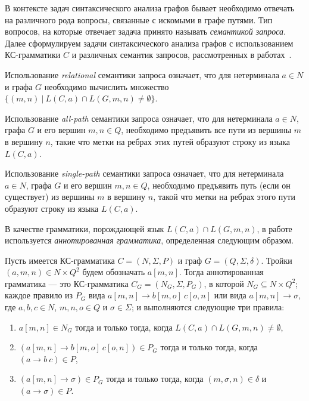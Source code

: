 В контексте задач синтаксического анализа графов бывает необходимо отвечать на различного рода вопросы, связанные с искомыми в графе путями. Тип вопросов, на которые отвечает задача принято называть \textit{семантикой запроса}. Далее сформулируем задачи синтаксического анализа графов с использованием КС-грамматики $C$ и различных семантик запросов, рассмотренных в работах~\cite{azimov-spbu-hellings1, azimov-spbu-hellings2}.

Использование \textit{relational} семантики запроса означает, что для нетерминала $a \in N$ и графа $G$ необходимо вычислить множество $\{(m, n)~|~L(C,a) \cap L(G,m,n) \neq \emptyset \}$.

Использование \textit{all-path} семантики запроса означает, что для нетерминала $a \in N$, графа $G$ и его вершин $m,n \in Q$, необходимо предъявить все пути из вершины $m$ в вершину $n$, такие что метки на ребрах этих путей образуют строку из языка $L(C,a)$.

Использование \textit{single-path} семантики запроса означает, что для нетерминала $a \in N$, графа $G$ и его вершин $m,n \in Q$, необходимо предъявить путь (если он существует) из вершины $m$ в вершину $n$, такой что метки на ребрах этого пути образуют строку из языка $L(C,a)$.

В качестве грамматики, порождающей язык $L(C,a) \cap L(G,m,n)$, в работе~\cite{azimov-spbu-hellings2} используется \textit{аннотированная грамматика}, определенная следующим образом.

\begin{mydef}
Пусть имеется КС-грамматика $C = (N,\Sigma,P)$ и граф $G = (Q,\Sigma,\delta)$. Тройки $(a,m,n) \in N \times Q^{2}$ будем обозначать $a[m,n]$. Тогда аннотированная грамматика --- это КС-грамматика $C_{G} = (N_{G}, \Sigma, P_{G})$, в которой $N_{G} \subseteq N \times Q^{2}$; каждое правило из $P_{G}$ вида $a[m,n] \rightarrow b[m,o]~c[o,n]$ или вида $a[m,n] \rightarrow \sigma$, где $a,b,c \in N$, $m, n, o \in Q$ и $\sigma \in \Sigma$; и выполняются следующие три правила:

\begin{enumerate}
\item $a[m,n] \in N_{G}$ тогда и только тогда, когда $L(C,a) \cap L(G,m,n) \neq \emptyset$,
\item $(a[m,n] \rightarrow b[m,o]~c[o,n]) \in P_{G}$ тогда и только тогда, когда $(a \rightarrow b~c) \in P$,
\item $(a[m,n] \rightarrow \sigma) \in P_{G}$ тогда и только тогда, когда $(m, \sigma, n) \in \delta$ и $(a \rightarrow \sigma) \in P$.
\end{enumerate}

\end{mydef}

